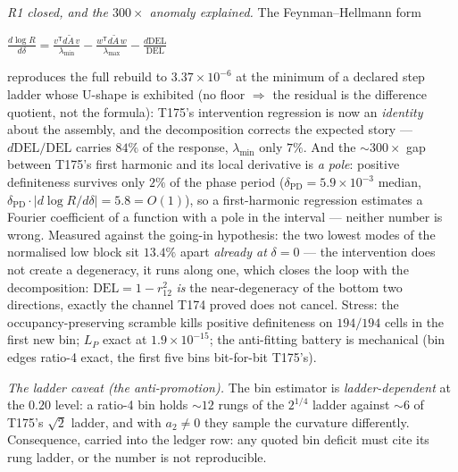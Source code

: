\documentclass[11pt,a4paper]{article}
\begin{document}
\emph{R1 closed, and the $300\times$ anomaly explained.} The
Feynman--Hellmann form
\begin{keyeq}$\displaystyle
\frac{d\log R}{d\delta}
=\frac{v^{\mathsf T}d\tilde A\,v}{\lambda_{\min}}
-\frac{w^{\mathsf T}d\tilde A\,w}{\lambda_{\max}}
-\frac{d\mathrm{DEL}}{\mathrm{DEL}}$
\end{keyeq}
\noindent reproduces the full rebuild to $3.37\times10^{-6}$ at the
minimum of a declared step ladder whose U-shape is exhibited (no
floor $\Rightarrow$ the residual is the difference quotient, not the
formula): T175's intervention regression is now an \emph{identity}
about the assembly, and the decomposition corrects the expected
story --- $d\mathrm{DEL}/\mathrm{DEL}$ carries $84\%$ of the response,
$\lambda_{\min}$ only $7\%$. And the ${\sim}300\times$ gap between
T175's first harmonic and its local derivative is \emph{a pole}:
positive definiteness survives only $2\%$ of the phase period
($\delta_{\mathrm{PD}}=5.9\times10^{-3}$ median,
$\delta_{\mathrm{PD}}\cdot|d\log R/d\delta|=5.8=O(1)$), so a
first-harmonic regression estimates a Fourier coefficient of a
function with a pole in the interval --- neither number is wrong.
Measured against the going-in hypothesis: the two lowest modes of the
normalised low block sit $13.4\%$ apart \emph{already at} $\delta=0$
--- the intervention does not create a degeneracy, it runs along one,
which closes the loop with the decomposition: $\mathrm{DEL}=1-r_{12}^2$
\emph{is} the near-degeneracy of the bottom two directions, exactly
the channel T174 proved does not cancel. Stress: the
occupancy-preserving scramble kills positive definiteness on
$194/194$ cells in the first new bin; $L_P$ exact at $1.9\times
10^{-15}$; the anti-fitting battery is mechanical (bin edges ratio-4
exact, the first five bins bit-for-bit T175's).

\emph{The ladder caveat (the anti-promotion).} The bin estimator is
\emph{ladder-dependent} at the $0.20$ level: a ratio-4 bin holds
${\sim}12$ rungs of the $2^{1/4}$ ladder against ${\sim}6$ of T175's
$\sqrt2$ ladder, and with $a_2\neq0$ they sample the curvature
differently. Consequence, carried into the ledger row: any quoted bin
deficit must cite its rung ladder, or the number is not reproducible.
\end{document}
